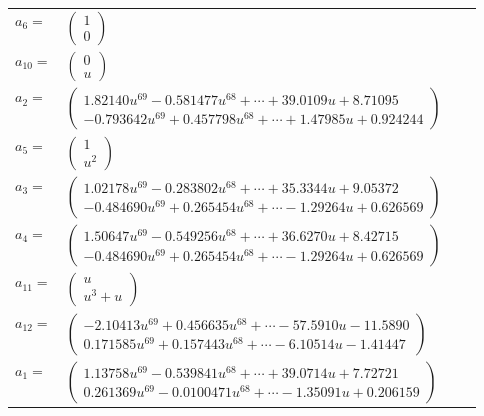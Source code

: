 \documentclass[1p]{elsarticle_modified}
\theoremstyle{definition}
\begin{document}
\begin{tabular}{m{7pt} m{180pt} m{7pt} m{180pt} }
\flushright $a_{6}=$&$\begin{pmatrix}1\\0\end{pmatrix}$ \\
\flushright $a_{10}=$&$\begin{pmatrix}0\\u\end{pmatrix}$ \\
\flushright $a_{2}=$&$\begin{pmatrix}1.82140 u^{69}-0.581477 u^{68}+\cdots+39.0109 u+8.71095\\-0.793642 u^{69}+0.457798 u^{68}+\cdots+1.47985 u+0.924244\end{pmatrix}$ \\
\flushright $a_{5}=$&$\begin{pmatrix}1\\u^2\end{pmatrix}$ \\
\flushright $a_{3}=$&$\begin{pmatrix}1.02178 u^{69}-0.283802 u^{68}+\cdots+35.3344 u+9.05372\\-0.484690 u^{69}+0.265454 u^{68}+\cdots-1.29264 u+0.626569\end{pmatrix}$ \\
\flushright $a_{4}=$&$\begin{pmatrix}1.50647 u^{69}-0.549256 u^{68}+\cdots+36.6270 u+8.42715\\-0.484690 u^{69}+0.265454 u^{68}+\cdots-1.29264 u+0.626569\end{pmatrix}$ \\
\flushright $a_{11}=$&$\begin{pmatrix}u\\u^3+u\end{pmatrix}$ \\
\flushright $a_{12}=$&$\begin{pmatrix}-2.10413 u^{69}+0.456635 u^{68}+\cdots-57.5910 u-11.5890\\0.171585 u^{69}+0.157443 u^{68}+\cdots-6.10514 u-1.41447\end{pmatrix}$ \\
\flushright $a_{1}=$&$\begin{pmatrix}1.13758 u^{69}-0.539841 u^{68}+\cdots+39.0714 u+7.72721\\0.261369 u^{69}-0.0100471 u^{68}+\cdots-1.35091 u+0.206159\end{pmatrix}$ \\

\end{tabular}
\end{document}
